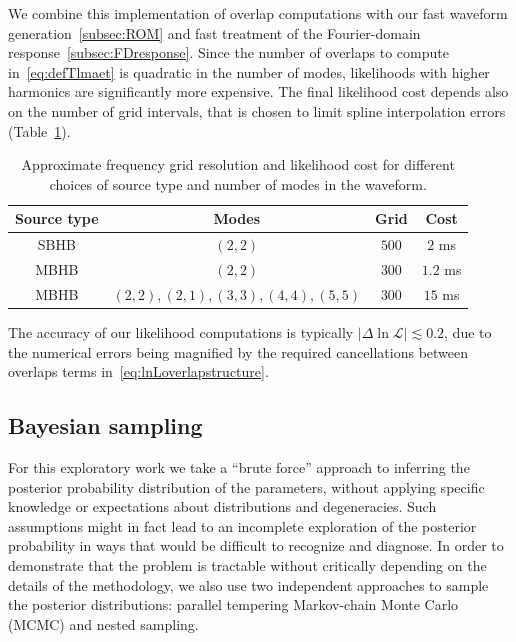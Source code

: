 \documentclass[aps,showpacs,twocolumn,prd,superscriptaddress,nofootinbib]{revtex4-1}
\newcommand\calL{{\mathcal{L}}}
\begin{document}
We combine this implementation of overlap computations with our fast waveform generation~\ref{subsec:ROM} and fast treatment of the Fourier-domain response~\ref{subsec:FDresponse}. Since the number of overlaps to compute in~\eqref{eq:defTlmaet} is quadratic in the number of modes, likelihoods with higher harmonics are significantly more expensive. The final likelihood cost depends also on the number of grid intervals, that is chosen to limit spline interpolation errors (Table~\ref{tab:likecost}).
\begin{table}
	\begin{tabular}{|c|c|c|c|}
		\hline
		Source type & Modes & Grid & Cost \\
		\hline
		SBHB & $(2,2)$ & $500$ & $2$ ms \\
		MBHB & $(2,2)$ & $300$ & $1.2$ ms \\
		MBHB & $(2,2),(2,1),(3,3),(4,4),(5,5)$ & $300$ & $15$ ms \\
		\hline
	\end{tabular}
	\label{tab:likecost}
	\caption{Approximate frequency grid resolution and likelihood cost for different choices of source type and number of modes in the waveform.}
\end{table}
The accuracy of our likelihood computations is typically $|\Delta \ln \calL| \lesssim 0.2$, due to the numerical errors being magnified by the required cancellations between overlaps terms in~\eqref{eq:lnLoverlapstructure}.



\subsection{Bayesian sampling}
\label{subsec:samplers}

For this exploratory work we take a ``brute force'' approach to inferring the posterior probability distribution of the parameters, without applying specific knowledge or expectations about distributions and degeneracies. Such assumptions might in fact lead to an incomplete exploration of the posterior probability in ways that would be difficult to recognize and diagnose. In order to demonstrate that the problem is tractable without critically depending on the details of the methodology, we also use two independent approaches to sample the posterior distributions: parallel tempering Markov-chain Monte Carlo (MCMC) and nested sampling.
\end{document}
